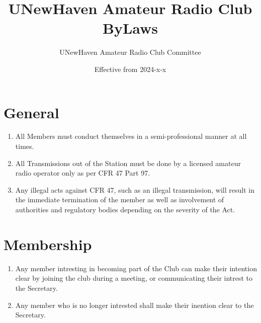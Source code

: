 \documentclass[a4paper,12pt]{article}
\title{UNewHaven Amateur Radio Club ByLaws}
\author{UNewHaven Amateur Radio Club Committee}
\date{Effective from 2024-x-x}
\begin{document}
\maketitle

\section{General}
\begin{enumerate}[label=\thesection.\arabic*.]
  \item All Members must conduct themselves in a semi-professional manner at all times.
  \item All Transmissions out of the Station must be done by a licensed amateur radio operator only as per CFR 47 Part 97.
  \item Any illegal acts against CFR 47, such as an illegal transmission, will result in the immediate termination of the member as well as involvement of authorities and regulatory bodies depending on the severity of the Act.
\end{enumerate}

\section{Membership}
\begin{enumerate}[label=\thesection.\arabic*.]
  \item Any member intresting in becoming part of the Club can make their intention clear by joining the club during a meeting, or communicating their intrest to the Secretary.
  \item Any member who is no longer intrested shall make their inention clear to the Secretary.
\end{enumerate}
\end{document}
